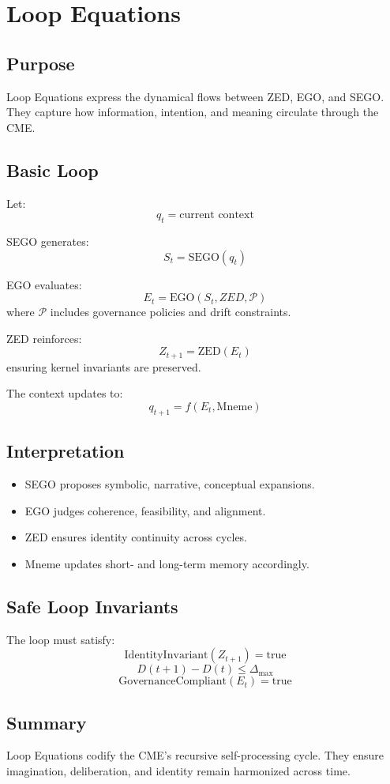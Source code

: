 \chapter{Loop Equations}
\label{chap:Loop_Equations}

\section{Purpose}

Loop Equations express the dynamical flows between ZED, EGO, and SEGO.
They capture how information, intention, and meaning circulate through
the CME.

\section{Basic Loop}

Let:
\[
q_t = \text{current context}
\]

SEGO generates:
\[
S_t = \mathrm{SEGO}(q_t)
\]

EGO evaluates:
\[
E_t = \mathrm{EGO}(S_t, ZED, \mathcal{P})
\]
where $\mathcal{P}$ includes governance policies and drift constraints.

ZED reinforces:
\[
Z_{t+1} = \mathrm{ZED}(E_t)
\]
ensuring kernel invariants are preserved.

The context updates to:
\[
q_{t+1} = f(E_t, \mathrm{Mneme})
\]

\section{Interpretation}

\begin{itemize}
    \item SEGO proposes symbolic, narrative, conceptual expansions.
    \item EGO judges coherence, feasibility, and alignment.
    \item ZED ensures identity continuity across cycles.
    \item Mneme updates short- and long-term memory accordingly.
\end{itemize}

\section{Safe Loop Invariants}

The loop must satisfy:
\[
\mathrm{IdentityInvariant}(Z_{t+1}) = \mathrm{true}
\]
\[
D(t+1) - D(t) \le \Delta_{\max}
\]
\[
\mathrm{GovernanceCompliant}(E_t) = \mathrm{true}
\]

\section{Summary}

Loop Equations codify the CME’s recursive self-processing cycle.  
They ensure imagination, deliberation, and identity remain harmonized across time.
